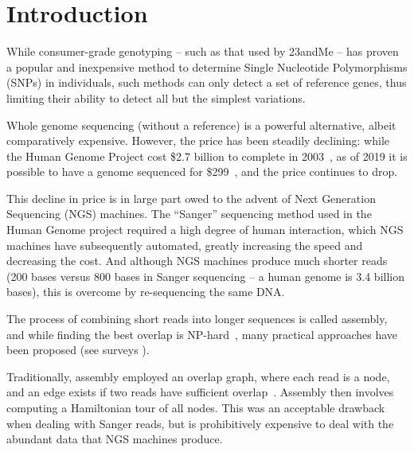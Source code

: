 \chapter{Introduction}
\label{chp:introduction}

While consumer-grade genotyping -- such as that used by 23andMe -- has proven a popular and inexpensive method to determine Single Nucleotide Polymorphisms (SNPs) in individuals, such methods can only detect a set of reference genes, thus limiting their ability to detect all but the simplest variations.

Whole genome sequencing (without a reference) is a powerful alternative, albeit comparatively expensive. However, the price has been steadily declining: while the Human Genome Project cost \$2.7 billion to complete in 2003~\cite{HGP}, as of 2019 it is possible to have a genome sequenced for \$299~\cite{dantelabscost}, and the price continues to drop.

This decline in price is in large part owed to the advent of Next Generation Sequencing (NGS) machines. The “Sanger” sequencing method used in the Human Genome project required a high degree of human interaction, which NGS machines have subsequently automated, greatly increasing the speed and decreasing the cost. And although NGS machines produce much shorter reads (200 bases versus 800 bases in Sanger sequencing -- a human genome is 3.4 billion bases), this is overcome by re-sequencing the same DNA.


The process of combining short reads into longer sequences is called assembly, and while finding the best overlap is NP-hard~\cite{Mye95}, many practical approaches have been proposed (see surveys \cite{KasMor06, MilKor10, Pop09}).

Traditionally, assembly employed an overlap graph, where each read is a node, and an edge exists if two reads have sufficient overlap~\cite{BatJaf02,HuaYan05,MyeSut00}. Assembly then involves computing a Hamiltonian tour of all nodes. This was an acceptable drawback when dealing with Sanger reads, but is prohibitively expensive to deal with the abundant data that NGS machines produce.

